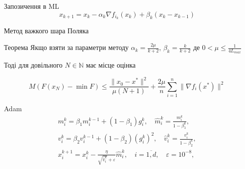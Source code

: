 \documentclass[a4paper, 14pt]{beamer}
\begin{document}
\begin{frame}{Запозичення в ML}
    $$x_{k+1} = x_k - \alpha_k \nabla f_{i_k}(x_k) + \beta_k (x_k - x_{k - 1})$$

\end{frame}

\begin{frame}{Метод важкого шара Поляка}
    \begin{theo}{Теорема}
        Якщо взяти за параметри методу $\alpha_k = \frac{2\mu}{k + 2}$, 
        $\beta_k = \frac{k}{k + 2}$ де $0 < \mu \le \frac{1}{4L_{max}}  $


        Тоді для довільного $N \in \mathbb{N}$ має місце оцінка


        $$M(F(x_N) - \min F) \le \frac{\|x_0 - x^*\|^2}{\mu(N+1)} + 
        \frac{2\mu}{n} \sum_{i = 1}^{n}\|\nabla f_i(x^*)\|^2$$
    \end{theo}
\end{frame}


\begin{frame}{Adam}
    \begin{equation}
        \begin{gathered}
            m_i^k=\beta_1 m_i^{k-1}+\left(1-\beta_1\right) g_i^k, \quad \hat{m}_i^k=\frac{m_i^k}{1-\beta_1^k}, \\
            v_i^k=\beta_2 v_i^{k-1}+\left(1-\beta_2\right)\left(g_i^k\right)^2, \quad \hat{v}_i^k=\frac{v_i^k}{1-\beta_2^k}, \\
            x_i^{k+1}=x_i^k-\frac{\eta}{\sqrt{\hat{v}_i^k}+\varepsilon} \hat{m}_i^k, \quad i=\overline{1, d}, \quad \varepsilon=10^{-8},
        \end{gathered}
    \end{equation}
\end{frame}
\end{document}
